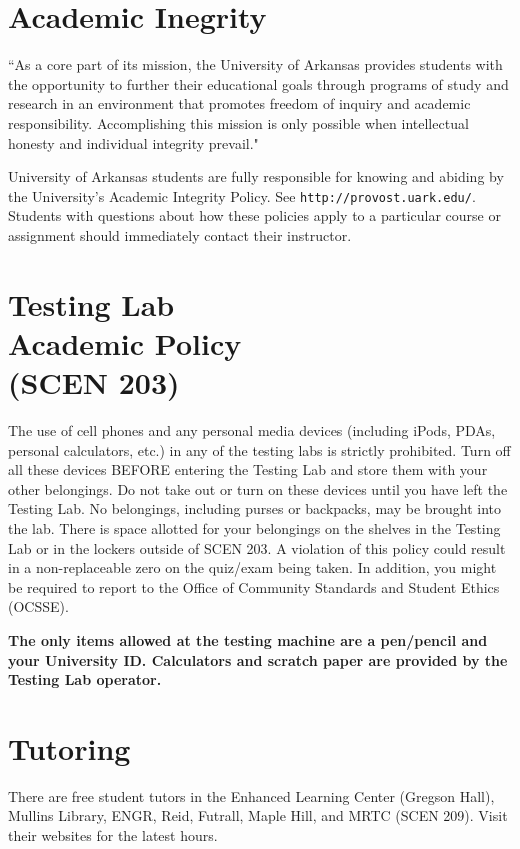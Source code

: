 \documentclass[margin,line,pifont,palatino,courier]{res}
\begin{document}
\begin{resume}
\section{\sc Academic Inegrity} ``As a core part of its mission, the University of Arkansas provides students with the opportunity to further their educational goals through programs of study and research in an environment that promotes freedom of inquiry and academic responsibility. Accomplishing this mission is only possible when intellectual honesty and individual integrity prevail." 

University of Arkansas students are fully responsible for knowing and abiding by the University's Academic Integrity Policy.  See \verb+http://provost.uark.edu/+. Students with questions about how these policies apply to a particular course or assignment should immediately contact their instructor.

\section{\sc Testing Lab \\ Academic Policy \\ (SCEN 203)} The use of cell phones and any personal media devices (including iPods, PDAs, personal calculators, etc.) in any of the testing labs is strictly prohibited. Turn off all these devices BEFORE entering the Testing Lab and store them with your other belongings. Do not take out or turn on these devices until you have left the Testing Lab. No belongings, including purses or backpacks, may be brought into the lab. There is space allotted for your belongings on the shelves in the Testing Lab or in the lockers outside of SCEN 203. A violation of this policy could result in a non-replaceable zero on the quiz/exam being taken. In addition, you might be required to report to the Office of Community Standards and Student Ethics (OCSSE). 

{\bf The only items allowed at the testing machine are a pen/pencil and your University ID. Calculators and scratch paper are provided by the Testing Lab operator. }

\section{\sc Tutoring} There are free student tutors in the Enhanced Learning Center (Gregson Hall), Mullins Library, ENGR, Reid, Futrall, Maple Hill, and MRTC (SCEN 209). Visit their websites for the latest hours.


\end{resume}
\end{document}
